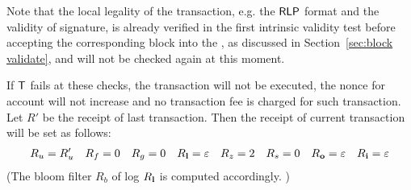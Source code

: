 

	

Note that the local legality of the transaction, 
e.g. the $\mathsf{RLP}$ format
and the validity of signature, 
is already verified in the first intrinsic validity test before accepting the corresponding block into the \name \tg, as discussed in Section~\ref{sec:block validate},
and will not be checked again at this moment.

If $\textsf{T}$ fails at these checks, the transaction will not be executed, the nonce for account will not increase and no transaction fee is charged for such transaction. Let $R'$ be the receipt of last transaction.
Then the receipt of current transaction will be set as follows:
\begin{align}
	R_u=R'_u && R_f=0 && R_g=0 && R_{\bf l}=\mathbb{\varepsilon} && R_z=2 && R_s=0 && R_{\bf o}=\mathbb{\varepsilon} && R_{\bf i}=\mathbb{\varepsilon}
\end{align}
%
(The bloom filter $R_b$ of log $R_{\bf l}$ is computed accordingly. 
)





